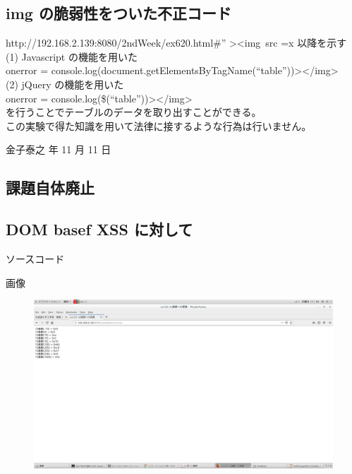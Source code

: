 \documentclass[a4j]{jarticle}
\begin{document}
    \subsection{img の脆弱性をついた不正コード}
      http://192.168.2.139:8080/2ndWeek/ex620.html\#” \textgreater \textless img\ src =x 以降を示す\\
      (1) Javascript の機能を用いた\\
      onerror = console.log(document.getElementsByTagName(“table”))\textgreater \textless/img\textgreater\\
      (2) jQuery の機能を用いた\\
      onerror = console.log(\$(“table”))\textgreater \textless/img\textgreater \\
      を行うことでテーブルのデータを取り出すことができる。\vspace{2em}\\
      この実験で得た知識を用いて法律に接するような行為は行いません。
      \begin{flushright}
        金子泰之 年 11 月 11 日
      \end{flushright}
    \subsection{課題自体廃止}
    \subsection{DOM basef XSS に対して}

\newpage
{\rm \huge ソースコード}
  
  \newpage
  
  \newpage
  
  \newpage
  
  \newpage
  
  \newpage
  
  \newpage
  
  \newpage
  
  \newpage
  
  \newpage

\newpage
{\rm \huge 画像}

\begin{figure}[htbp]
  \centering
  \includegraphics[width=13cm]{../webapp/png/1_1.png}
  \caption{}
  \label{}
\end{figure}
\end{document}
